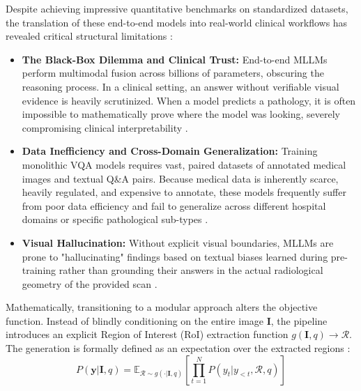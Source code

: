 Despite achieving impressive quantitative benchmarks on standardized datasets, the translation of these end-to-end models into real-world clinical workflows has revealed critical structural limitations \cite{gao2024mllm-health}:
\begin{itemize}
\item \textbf{The Black-Box Dilemma and Clinical Trust:} End-to-end MLLMs perform multimodal fusion across billions of parameters, obscuring the reasoning process. In a clinical setting, an answer without verifiable visual evidence is heavily scrutinized. When a model predicts a pathology, it is often impossible to mathematically prove where the model was looking, severely compromising clinical interpretability \cite{lin2023medical-mllm-survey}.
\item \textbf{Data Inefficiency and Cross-Domain Generalization:} Training monolithic VQA models requires vast, paired datasets of annotated medical images and textual Q\&A pairs. Because medical data is inherently scarce, heavily regulated, and expensive to annotate, these models frequently suffer from poor data efficiency and fail to generalize across different hospital domains or specific pathological sub-types \cite{he2024medical-vqa-robustness}.
\item \textbf{Visual Hallucination:} Without explicit visual boundaries, MLLMs are prone to "hallucinating" findings based on textual biases learned during pre-training rather than grounding their answers in the actual radiological geometry of the provided scan \cite{ji2023hallucination-survey}.
\end{itemize}

Mathematically, transitioning to a modular approach alters the objective function. Instead of blindly conditioning on the entire image $\mathbf{I}$, the pipeline introduces an explicit Region of Interest (RoI) extraction function $g(\mathbf{I}, q) \rightarrow \mathcal{R}$. The generation is formally defined as an expectation over the extracted regions \cite{chen2024rllava}:
\begin{equation}
P(\mathbf{y} | \mathbf{I}, q) = \mathbb{E}_{\mathcal{R} \sim g(\cdot|\mathbf{I},q)} \left[ \prod_{t=1}^{N} P(y_{t}|y_{<t},\mathcal{R},q) \right]
\end{equation}

